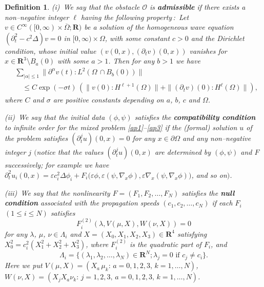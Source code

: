 \documentclass[12pt]{amsart}
\newcommand{\R}{{\mathbf R}}
\newcommand{\ve}{\varepsilon}
\newcommand{\pa}{\partial}
\newtheorem{definition}[theorem]{Definition}
\numberwithin{equation}{section}
\begin{document}
\begin{definition}
{\rm (i)}\ 
We say that the obstacle ${\mathcal O}$ is {\bf admissible} if 
there exists a non--negative integer $\ell$ having the following property\,{\rm :}\
Let $v \in C^\infty([0,\infty)\times \overline{\Omega}; \R)$ be a solution
of the homogeneous wave equation 
$(\pa_t^2-c^2\Delta)v=0$ in $[0,\infty)\times \Omega$,
with some constant $c>0$ and the Dirichlet condition,
whose initial value $(v(0,x), (\partial_t v)(0,x))$ vanishes
for $x \in \R^3 \setminus {B_a(0)}$ with some $a>1$.
Then for any $b>1$ we have
\begin{align}\label{obstacle}
&\sum_{|\alpha| \le 1}
 \|\partial^\alpha v(t):L^2({\Omega\,\cap B_b(0)})\|
\\ \nonumber
& \quad \le C \exp(-\sigma t)\,(\|v(0):H^{\ell+1}(\Omega)\|
 {}+\|(\partial_t v)(0):H^{\ell}(\Omega)\|),
\end{align}
where $C$ and $\sigma$ are positive constants depending on $a$, $b$, $c$ and $\Omega$.

\medskip

\noindent
{\rm (ii)}\ 
We say that the initial data $(\phi,\psi)$ satisfies the {\bf compatibility condition}
to infinite order for the mixed problem \eqref{ap1}--\eqref{ap3} 
if the {\rm (}formal{\rm)} 
solution $u$ of the problem satisfies
$(\partial^j_t u)(0,x)=0$ for any
$x \in \partial\Omega$ and 
any non--negative integer $j$
$($notice that the values $(\partial^j_t u)(0,x)$ are determined by $(\phi,\psi)$ and
$F$ successively; for example we have
$\pa_t^2u_i(0,x)=\ve c_i^2 \Delta\phi_i+F_i\bigl(\ve\phi, \ve(\psi, \nabla_x\phi), \ve\nabla_x(\psi, \nabla_x \phi) \bigr)$, and so on$)$.

\medskip


\noindent
{\rm (iii)}\ 
We say that the nonlinearity 
$F=(F_1, F_2, \dots, F_N)$
satisfies the {\bf null condition} associated with the
propagation speeds $(c_1, c_2, \dots, c_N)$ if 
each $F_i$ $(1\le i\le N)$ satisfies
\begin{equation}\label{nullc}
F_i^{(2)}(\lambda, V(\mu,X), W(\nu,X))=0
\end{equation}
for any  
$\lambda$, $\mu$, $\nu \in \Lambda_i$ and 
$X=(X_0, X_1, X_2, X_3)\in \R^{4}$ satisfying 
$X_0^2=c_i^2(X_1^2+X_2^2+X_3^2)$, where $F_i^{(2)}$ is the quadratic part 
of $F_i$, and
$$
 \Lambda_i=\{(\lambda_1, \lambda_2, \ldots, \lambda_N)\in \R^N;
 \lambda_j=0 \text{ if } c_j\ne c_i\}.
$$
Here we put
$V(\mu,X)=(X_a\,\mu_k:\,a=0,1,2,3, \,k=1, \dots, N)$, 
$W(\nu,X)=(X_j X_a \nu_k:\,j=1,2,3, \,a=0,1,2,3, \,k=1, \dots, N)$.
\end{definition}
\end{document}
